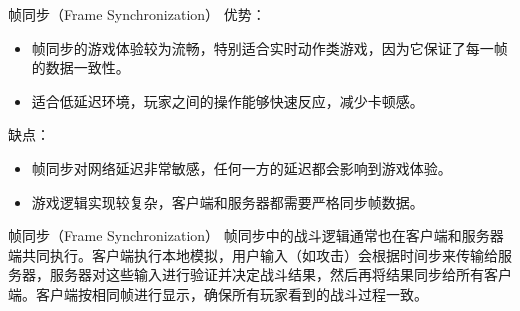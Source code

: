 \documentclass{beamer}
\begin{document}

\begin{frame}[fragile]{帧同步（Frame Synchronization）}
优势：
\begin{itemize}
\item 帧同步的游戏体验较为流畅，特别适合实时动作类游戏，因为它保证了每一帧的数据一致性。
\item 适合低延迟环境，玩家之间的操作能够快速反应，减少卡顿感。
\end{itemize}

\vspace{1em}

缺点：
\begin{itemize}
\item 帧同步对网络延迟非常敏感，任何一方的延迟都会影响到游戏体验。
\item 游戏逻辑实现较复杂，客户端和服务器都需要严格同步帧数据。
\end{itemize}
\end{frame}


\begin{frame}[fragile]{帧同步（Frame Synchronization）}
帧同步中的战斗逻辑通常也在客户端和服务器端共同执行。客户端执行本地模拟，用户输入（如攻击）会根据时间步来传输给服务器，服务器对这些输入进行验证并决定战斗结果，然后再将结果同步给所有客户端。客户端按相同帧进行显示，确保所有玩家看到的战斗过程一致。
\end{frame}

\end{document}
